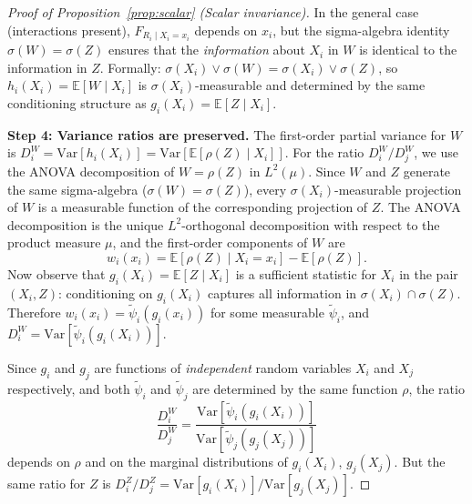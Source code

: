 \documentclass[11pt,onecolumn]{article}
\begin{document}
\begin{proof}[Proof of Proposition~\ref{prop:scalar} (Scalar invariance)]
In the general case (interactions present), $F_{R_i \mid X_i = x_i}$
depends on $x_i$, but the sigma-algebra identity $\sigma(W) = \sigma(Z)$
ensures that the \emph{information} about $X_i$ in $W$ is identical to the
information in $Z$.  Formally: $\sigma(X_i) \vee \sigma(W) = \sigma(X_i) \vee \sigma(Z)$,
so $h_i(X_i) = \mathbb{E}[W \mid X_i]$ is $\sigma(X_i)$-measurable and determined
by the same conditioning structure as $g_i(X_i) = \mathbb{E}[Z \mid X_i]$.

\textbf{Step 4: Variance ratios are preserved.}\quad
The first-order partial variance for $W$ is
$D_i^W = \mathrm{Var}[h_i(X_i)] = \mathrm{Var}[\mathbb{E}[\rho(Z) \mid X_i]]$.
For the ratio $D_i^W / D_j^W$, we use the ANOVA decomposition of $W = \rho(Z)$
in $L^2(\mu)$.  Since $W$ and $Z$ generate the same sigma-algebra
($\sigma(W) = \sigma(Z)$), every $\sigma(X_i)$-measurable projection of $W$
is a measurable function of the corresponding projection of $Z$.  The ANOVA
decomposition is the unique $L^2$-orthogonal decomposition with respect to
the product measure $\mu$, and the first-order components of $W$ are
\[
  w_i(x_i) = \mathbb{E}[\rho(Z)\mid X_i = x_i] - \mathbb{E}[\rho(Z)].
\]
Now observe that $g_i(X_i) = \mathbb{E}[Z\mid X_i]$ is a sufficient statistic
for $X_i$ in the pair $(X_i, Z)$: conditioning on $g_i(X_i)$ captures all
information in $\sigma(X_i) \cap \sigma(Z)$.
Therefore $w_i(x_i) = \tilde{\psi}_i(g_i(x_i))$ for some measurable
$\tilde{\psi}_i$, and $D_i^W = \mathrm{Var}[\tilde{\psi}_i(g_i(X_i))]$.

Since $g_i$ and $g_j$ are functions of \emph{independent} random variables
$X_i$ and $X_j$ respectively, and both $\tilde{\psi}_i$ and $\tilde{\psi}_j$
are determined by the same function $\rho$, the ratio
\[
  \frac{D_i^W}{D_j^W}
  = \frac{\mathrm{Var}[\tilde{\psi}_i(g_i(X_i))]}
         {\mathrm{Var}[\tilde{\psi}_j(g_j(X_j))]}
\]
depends on $\rho$ and on the marginal distributions of $g_i(X_i)$, $g_j(X_j)$.
But the same ratio for $Z$ is
$D_i^Z/D_j^Z = \mathrm{Var}[g_i(X_i)]/\mathrm{Var}[g_j(X_j)]$.


\end{proof}
\end{document}
